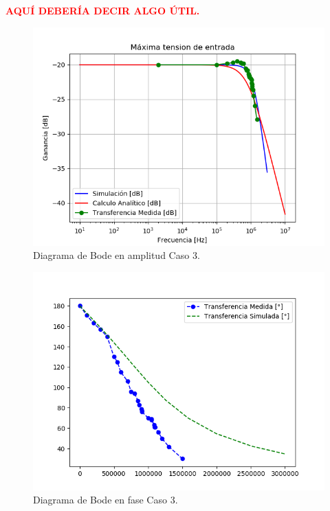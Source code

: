 \begin{center}
\textcolor{red}{\textbf{AQUÍ DEBERÍA DECIR ALGO ÚTIL.}}
\end{center}

\begin{figure}[H]	
	\centering
	\includegraphics[width=\textwidth]{Ejercicio1/Imagenes/BodeC3.png}
	\caption{Diagrama de Bode en amplitud Caso 3.}
	\label{fig:BodeC3}
\end{figure} 
\begin{figure}[H]	
	\centering
	\includegraphics[width=\textwidth]{Ejercicio1/Imagenes/BodephC3.png}
	\caption{Diagrama de Bode en fase Caso 3.}
	\label{fig:BodephC3}
\end{figure} 


